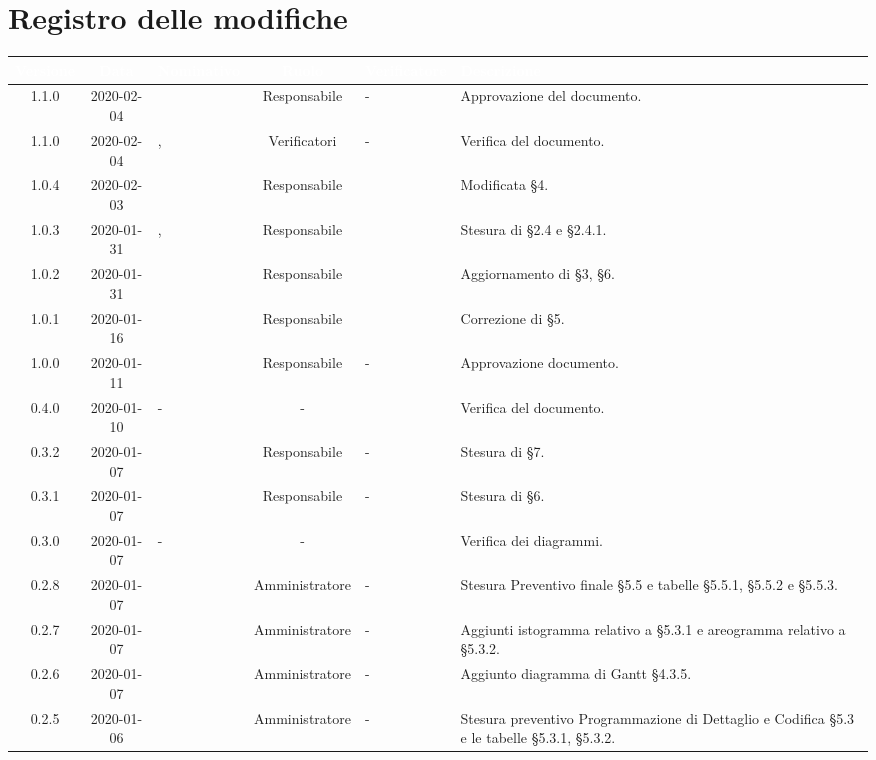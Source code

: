 \section*{Registro delle modifiche}
\setcounter{table}{-1}
{
\renewcommand{\arraystretch}{1.5}
\centering
\begin{longtable}{ c c  C{2.5cm} c C{2.5cm} C{3.5cm}}
\textcolor{white}{\textbf{Versione}} &
\textcolor{white}{\textbf{Data}}&
\textcolor{white}{\textbf{Nominativo}}&
\textcolor{white}{\textbf{Ruolo}}&
\textcolor{white}{\textbf{Verificatore}}&
\textcolor{white}{\textbf{Descrizione}}\\
\endhead

1.1.0 & 2020-02-04 & \MC{} & Responsabile & - & Approvazione del documento. \\
1.1.0 & 2020-02-04 & \BR{}, \PF{} & Verificatori & - & Verifica del documento. \\
1.0.4 & 2020-02-03 & \MC{} & Responsabile & \PF{} \newline \SE{} & Modificata §4. \\
1.0.3 & 2020-01-31 & \MC{}, \AT{} & Responsabile & \PF{} & Stesura di §2.4 e §2.4.1. \\
1.0.2 & 2020-01-31 & \AT{} & Responsabile & \PF{}\newline \SE{} & Aggiornamento di §3, §6. \\
1.0.1 & 2020-01-16 & \SE{} & Responsabile & \PF{} & Correzione di §5. \\
1.0.0 & 2020-01-11 & \SE{} & Responsabile & - & Approvazione documento. \\
0.4.0 & 2020-01-10 & - & - & \AT{} & Verifica del documento. \\
0.3.2 & 2020-01-07 & \SE{} & Responsabile & - & Stesura di §7. \\
0.3.1 & 2020-01-07 & \SE{} & Responsabile & - & Stesura di §6. \\
0.3.0 & 2020-01-07 & - & - & \MC{} & Verifica dei diagrammi. \\
0.2.8 & 2020-01-07 & \LD{} & Amministratore & - & Stesura Preventivo finale §5.5 e tabelle §5.5.1, §5.5.2 e §5.5.3. \\
0.2.7 & 2020-01-07 & \LD{} & Amministratore & - & Aggiunti istogramma relativo a §5.3.1 e areogramma relativo a §5.3.2. \\
0.2.6 & 2020-01-07 & \LD{} & Amministratore & - & Aggiunto diagramma di Gantt §4.3.5. \\
0.2.5 & 2020-01-06 & \LD{} & Amministratore & - & Stesura preventivo Programmazione di Dettaglio e Codifica §5.3 e le tabelle §5.3.1, §5.3.2. \\

\end{longtable}}
